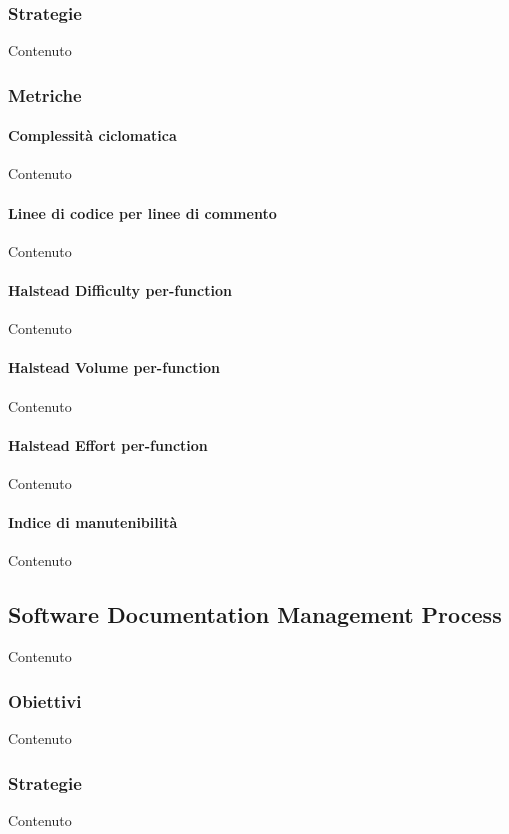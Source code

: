     \subsubsection{Strategie}
    Contenuto


    \subsubsection{Metriche}

    \paragraph{Complessit\`a ciclomatica}
    Contenuto

    \paragraph{Linee di codice per linee di commento}
    Contenuto

    \paragraph{Halstead Difficulty per-function}
    Contenuto

    \paragraph{Halstead Volume per-function}
    Contenuto

    \paragraph{Halstead Effort per-function}
    Contenuto

    \paragraph{Indice di manutenibilit\`a}
    Contenuto


    \subsection{Software Documentation Management Process}
    Contenuto

    \subsubsection{Obiettivi}
    Contenuto

    \subsubsection{Strategie}
    Contenuto


